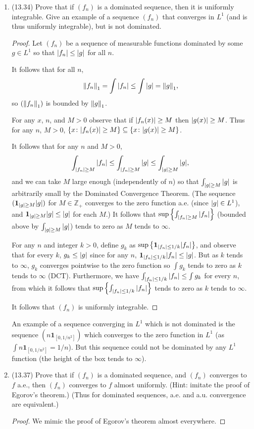 \documentclass[11pt]{article}
\newcommand{\cbr}[1]{\left\{#1\right\}}
\begin{document}
\begin{enumerate}
    \item (13.34) Prove that if $(f_n)$ is a dominated sequence, then it is uniformly integrable. Give an example of a sequence $(f_n)$ that converges in $L^1$ (and is thus uniformly integrable), but is not dominated. \begin{proof}
        Let $(f_n)$ be a sequence of measurable functions dominated by some $g\in L^1$ so that $\abs{f_n}\leq \abs{g}$ for all $n$.

        It follows that for all $n$, \[\norm{f_n}_1 = \int \abs{f_n} \leq \int \abs{g}=\norm{g}_1,\] so $(\norm{f_n}_1)$ is bounded by $\norm{g}_1$.

        For any $x$, $n$, and $M>0$ observe that if $\abs{f_n(x)}\geq M$ then $\abs{g(x)}\geq M$. Thus for any $n$, $M>0$,  $\cbr{x\colon \abs{f_n(x)}\geq M}\subseteq \cbr{x\colon \abs{g(x)}\geq M}$.

        It follows that for any $n$ and $M>0$, \[\int_{\abs{f_n}\geq M}\abs{f_n}\leq \int_{\abs{f_n}\geq M}\abs{g}\leq\int_{\abs{g}\geq M}\abs{g},\] and we can take $M$ large enough (independently of $n$) so that $\int_{\abs{g}\geq M}\abs{g}$ is arbitrarily small by the Dominated Convergence Theorem. (The sequence $(\mathbf{1}_{\abs{g}\geq M}\abs{g})$ for $M\in\mathbb{Z}_+$ converges to the zero function a.e. (since $\abs{g}\in L^1$), and $\mathbf{1}_{\abs{g}\geq M}\abs{g}\leq \abs{g}$ for each $M$.) It follows that $\sup\cbr{\int_{\abs{f_n}\geq M}\abs{f_n}}$ (bounded above by $\int_{\abs{g}\geq M}\abs{g}$) tends to zero as $M$ tends to $\infty$.

        For any $n$ and integer $k>0$, define $g_k$ as $\sup\cbr{\mathbf{1}_{\abs{f_n}\leq 1/k}\abs{f_n}}$, and observe that for every $k$, $g_k\leq \abs{g}$ since for any $n$, $\mathbf{1}_{\abs{f_n}\leq 1/k}\abs{f_n}\leq \abs{g}$. But as $k$ tends to $\infty$, $g_k$ converges pointwise to the zero function so $\int g_k$ tends to zero as $k$ tends to $\infty$ (DCT). Furthermore, we have $\int_{\abs{f_n}\leq 1/k}\abs{f_n}\leq \int g_k$ for every $n$, from which it follows that $\sup\cbr{\int_{\abs{f_n}\leq 1/k}\abs{f_n}}$ tends to zero as $k$ tends to $\infty$.

        It follows that $(f_n)$ is uniformly integrable.
    \end{proof}

    An example of a sequence converging in $L^1$ which is not dominated is the sequence $(n\mathbf{1}_{[0,1/n^2]})$ which converges to the zero function in $L^1$ (as $\int n\mathbf{1}_{[0,1/n^2]} = 1/n$). But this sequence could not be dominated by any $L^1$ function (the height of the box tends to $\infty$).
    \item (13.37) Prove that if $(f_n)$ is a dominated sequence, and $(f_n)$ converges to $f$ a.e., then $(f_n)$ converges to $f$ almost uniformly. (Hint: imitate the proof of Egorov's theorem.) (Thus for dominated sequences, a.e. and a.u. convergence are equivalent.) \begin{proof}
      We mimic the proof of Egorov's theorem almost everywhere.
      

\end{proof}
\end{enumerate}
\end{document}
